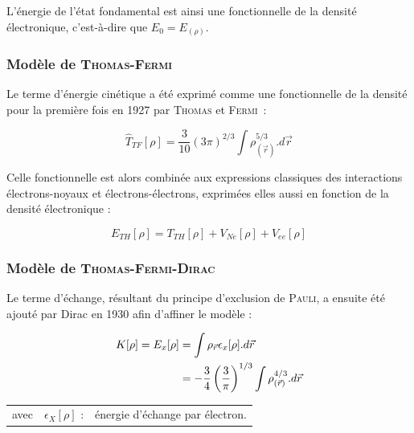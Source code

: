 L'énergie de l'état fondamental est ainsi une fonctionnelle de la densité électronique, c'est-à-dire que $E_{0} = E_{(\rho)}$.

\subsubsection{Modèle de \textsc{Thomas-Fermi}}

Le terme d'énergie cinétique a été exprimé comme une fonctionnelle de la densité pour la première fois en 1927 par \textsc{Thomas} et \textsc{Fermi}~:

\begin{equation}
\hat{T}_{TF}[\rho] = \frac{3}{10} (3\pi)^{2/3} \int \rho_{(\vec{r})}^{5/3} .d\vec{r}
\label{ener_cin_thom_ferm}
\end{equation}

Celle fonctionnelle est alors combinée aux expressions classiques des interactions électrons-noyaux et électrons-électrons, exprimées elles aussi en fonction de la densité électronique :

\begin{equation}
E_{TH}[\rho] = T_{TH}[\rho] + V_{Ne}[\rho] + V_{ee}[\rho]
\end{equation}

\subsubsection{Modèle de \textsc{Thomas-Fermi-Dirac}}

Le terme d'échange, résultant du principe d'exclusion de \textsc{Pauli}, a ensuite été ajouté par Dirac en 1930 afin d'affiner le modèle :

\begin{align}
K[\rho] = E_{x}[\rho] &= \int \rho_{\vec{r}} \epsilon_{x}[\rho] .d\vec{r} \\
&= -\frac{3}{4} \left(\frac{3}{\pi}\right)^{1/3} \int \rho_{(\vec{r})}^{4/3} .d\vec{r} \notag
\end{align}

\begin{flushleft}
\begin{tabular}{@{}lrp{10cm}}
avec & $\epsilon_{X}[\rho]$ : & énergie d'échange par électron. 
\end{tabular}
\end{flushleft}

